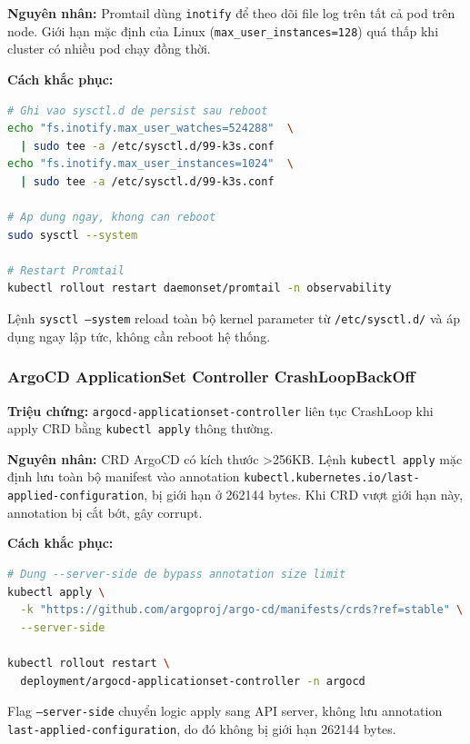 \textbf{Nguyên nhân:} Promtail dùng \texttt{inotify} để theo dõi file log trên tất cả pod trên node. Giới hạn mặc định của Linux (\texttt{max\_user\_instances=128}) quá thấp khi cluster có nhiều pod chạy đồng thời.

\textbf{Cách khắc phục:}

\begin{lstlisting}[language=bash]
# Ghi vao sysctl.d de persist sau reboot
echo "fs.inotify.max_user_watches=524288"  \
  | sudo tee -a /etc/sysctl.d/99-k3s.conf
echo "fs.inotify.max_user_instances=1024"  \
  | sudo tee -a /etc/sysctl.d/99-k3s.conf

# Ap dung ngay, khong can reboot
sudo sysctl --system

# Restart Promtail
kubectl rollout restart daemonset/promtail -n observability
\end{lstlisting}

Lệnh \texttt{sysctl --system} reload toàn bộ kernel parameter từ \texttt{/etc/sysctl.d/} và áp dụng ngay lập tức, không cần reboot hệ thống.

\subsubsection{ArgoCD ApplicationSet Controller CrashLoopBackOff}

\textbf{Triệu chứng:} \texttt{argocd-applicationset-controller} liên tục CrashLoop khi apply CRD bằng \texttt{kubectl apply} thông thường.

\textbf{Nguyên nhân:} CRD ArgoCD có kích thước \textgreater{}256KB. Lệnh \texttt{kubectl apply} mặc định lưu toàn bộ manifest vào annotation \texttt{kubectl.kubernetes.io/last-applied-configuration}, bị giới hạn ở 262144 bytes. Khi CRD vượt giới hạn này, annotation bị cắt bớt, gây corrupt.

\textbf{Cách khắc phục:}

\begin{lstlisting}[language=bash]
# Dung --server-side de bypass annotation size limit
kubectl apply \
  -k "https://github.com/argoproj/argo-cd/manifests/crds?ref=stable" \
  --server-side

kubectl rollout restart \
  deployment/argocd-applicationset-controller -n argocd
\end{lstlisting}

Flag \texttt{--server-side} chuyển logic apply sang API server, không lưu annotation \texttt{last-applied-configuration}, do đó không bị giới hạn 262144 bytes.


